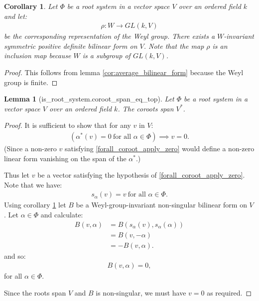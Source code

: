 \documentclass[12pt, a4paper]{article}
\newtheorem{lemma}{Lemma}[section]
\newtheorem{corollary}{Corollary}[section]
\begin{document}
\begin{corollary}\label{cor:weyl_invariant_bilinear}
  Let $\Phi$ be a root system in a vector space $V$ over an ordered field $k$ and let:
  \begin{align*}
    \rho : W \to GL(k, V)
  \end{align*}
  be the corresponding representation of the Weyl group. There exists a $W$-invariant symmetric
  positive definite bilinear form on $V$. Note that the map $\rho$ is an inclusion map
  because $W$ is a subgroup of $GL(k, V)$.
\end{corollary}
\begin{proof}
  This follows from lemma \ref{cor:average_bilinear_form} because the Weyl
  group is finite.
\end{proof}

\begin{lemma}[is\_root\_system.coroot\_span\_eq\_top]
  Let $\Phi$ be a root system in a vector space $V$ over an ordered field $k$. The coroots span
  $V^*$.
\end{lemma}
\begin{proof}
  It is sufficient to show that for any $v$ in $V$:
  \begin{align}\label{forall_coroot_apply_zero}
    (\alpha^*(v) = 0 ~\mbox{for all $\alpha \in \Phi$}) \implies v = 0.
  \end{align}
  (Since a non-zero $v$ satisfying \eqref{forall_coroot_apply_zero} would define a non-zero linear
  form vanishing on the span of the $\alpha^*$.)

  Thus let $v$ be a vector satisfying the hypothesis of \eqref{forall_coroot_apply_zero}. Note that
  we have:
  \begin{align*}
    s_\alpha(v) = v ~\mbox{for all $\alpha \in \Phi$}.
  \end{align*}
  Using corollary \ref{cor:weyl_invariant_bilinear} let $B$ be a Weyl-group-invariant non-singular
  bilinear form on $V$. Let $\alpha \in \Phi$ and calculate:
  \begin{align*}
    B(v, \alpha) &= B(s_\alpha(v), s_\alpha(\alpha))\\
                 &= B(v, -\alpha)\\
                 &= -B(v, \alpha).
  \end{align*}
  and so:
  \begin{align*}
    B(v, \alpha) = 0,
  \end{align*}
  for all $\alpha \in \Phi$.

  Since the roots span $V$ and $B$ is non-singular, we must have $v = 0$ as required.
\end{proof}
\end{document}
